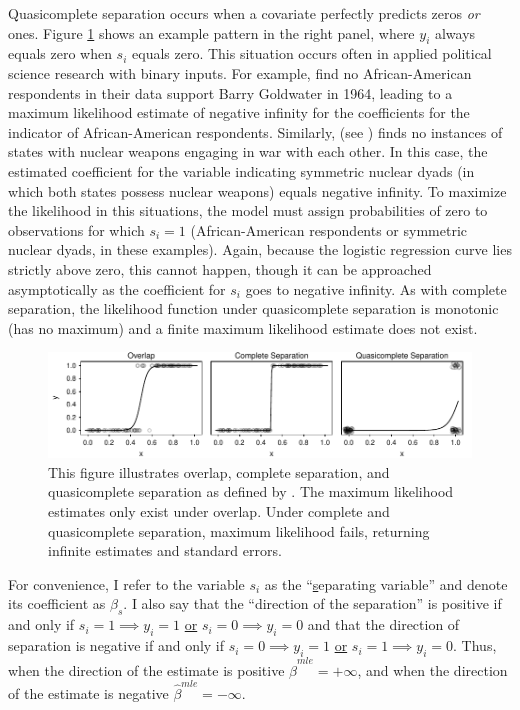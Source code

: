 \documentclass[12pt]{article}
\begin{document}
Quasicomplete separation occurs when a covariate perfectly predicts zeros \textit{or} ones. Figure \ref{fig:illustrating_separation} shows an example pattern in the right panel, where $y_i$ always equals zero when $s_i$ equals zero. This situation occurs often in applied political science research with binary inputs. For example, \cite{Gelmanetal2008} find no African-American respondents in their data support Barry Goldwater in 1964, leading to a maximum likelihood estimate of negative infinity for the coefficients for the indicator of African-American respondents. Similarly, \cite{Rauchhaus2009} (see \citealt{BellMiller2014}) finds no instances of states with nuclear weapons engaging in war with each other. In this case, the estimated coefficient for the variable indicating symmetric nuclear dyads (in which both states possess nuclear weapons) equals negative infinity. To maximize the likelihood in this situations, the model must assign probabilities of zero to observations for which $s_i = 1$ (African-American respondents or symmetric nuclear dyads, in these examples). Again, because the logistic regression curve lies strictly above zero, this cannot happen, though it can be approached asymptotically as the coefficient for $s_i$ goes to negative infinity. As with complete separation, the likelihood function under quasicomplete separation is monotonic (has no maximum) and a finite maximum likelihood estimate does not exist.

\begin{figure}[H]
\begin{center}
\includegraphics[scale = 1]{figs/illustrate-separation.pdf}
\end{center}
\caption{This figure illustrates overlap, complete separation, and quasicomplete separation as defined by \cite{AlbertAnderson1984}. The maximum likelihood estimates only exist under overlap. Under complete and quasicomplete separation, maximum likelihood fails, returning infinite estimates and standard errors.}\label{fig:illustrating_separation}
\end{figure}

For convenience, I refer to the variable $s_i$ as the ``\underline{s}eparating variable'' and denote its coefficient as $\beta_s$. I also say that the ``direction of the separation'' is positive if and only if $s_i = 1 \implies y_i = 1$ \underline{or} $s_i = 0 \implies y_i = 0$ and that the direction of separation is negative if and only if $s_i = 0 \implies y_i = 1$ \underline{or} $s_i = 1 \implies y_i = 0$. Thus, when the direction of the estimate is positive $\hat{\beta}^{mle} = +\infty$, and when the direction of the estimate is negative $\hat{\beta}^{mle} = -\infty$.
\end{document}
